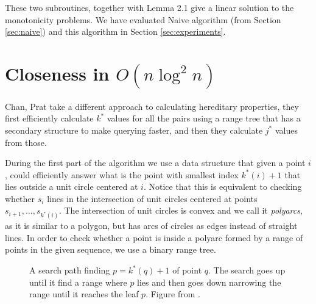 \documentclass{article}
\begin{document}
These two subroutines, together with Lemma 2.1 give a linear solution
to the monotonicity problems. We have evaluated Naive algorithm
(from Section \ref{sec:naive}) and this algorithm in Section
\ref{sec:experiments}.



\section{Closeness in $O(n \log^2 n)$}
\label{sec:closeness}

Chan, Prat \cite{chan2016} take a different approach to calculating
hereditary properties, they first efficiently calculate $k^*$ values
for all the pairs using a range tree \cite{lueker1978data} that has
a secondary structure to make querying faster, and then they calculate
$j^*$ values from those.

During the first part of the algorithm we use a data structure
that given a point $i$, could efficiently answer what is the point
with smallest index $k^*(i)+1$ that lies outside a unit circle
centered at $i$. Notice that this is equivalent to checking whether
$s_i$ lines in the intersection of unit circles centered at points
$s_{i+1}, \dots, s_{k^*(i)}$. The intersection of unit circles is
convex and we call it \textit{polyarcs}, as it is similar to a
polygon, but has arcs of circles as edges instead of straight lines.
In order to check whether a point is inside a polyarc formed by a
range of points in the given sequence, we use a binary range tree.

\begin{figure}[h]
    \centering
    \label{fig:query_path}
    \caption{A search path finding $p = k^*(q) + 1$ of point $q$.
    The search goes up until it find a range where $p$ lies and
    then goes down narrowing the range until it reaches the
    leaf $p$.
    Figure from \cite{chan2016}.}
\end{figure}
\end{document}
